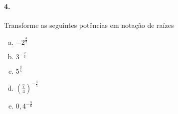 \documentclass[a4paper,twocolumn,12pt]{article}
\begin{document}
\paragraph*{4.} Transforme as seguintes potências em notação de raízes
\begin{enumerate}[a)]
    \item $-2^{\frac{3}{2}}$
    \item $3^{-\frac{2}{3}}$
    \item $5^{\frac{3}{6}}$
    \item $\left(\displaystyle\frac{7}{4}\right)^{-\frac{3}{5}}$
    \item $0,\!4^{-\frac{5}{6}}$
\end{enumerate}
\end{document}
